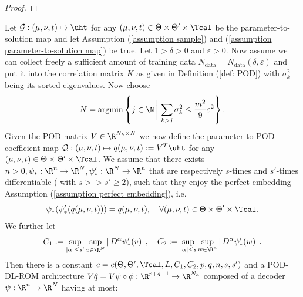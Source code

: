 \begin{proof}

\end{proof}




\begin{theorem} \label{theo: PAC bound for POD-DL-ROM}
    Let $\mathcal{G}: (\mu, \nu, t) \mapsto \uht$ for any $(\mu, \nu, t) \in \Theta \times \Theta' \times \Tcal$ be the
    parameter-to-solution map and let Assumption (\ref{assumption sample}) and (\ref{assumption parameter-to-solution map}) be true. Let $1  > \delta > 0$ and $\varepsilon > 0$.
    Now assume we can collect freely a sufficient amount of training data $N_{\text{data}} = N_{\text{data}}(\delta, \varepsilon)$ and put it into the
    correlation matrix $K$ as given in Definition (\ref{def: POD}) with $\sigma_k^2$ being its sorted eigenvalues. Now choose
    \begin{equation*}
        N = \operatorname{argmin} \left\{ j \in \N \, \bigg\vert \, \sum_{k > j} \sigma^2_k \leq \frac{m^2}{9} \varepsilon^2 \right\}.
    \end{equation*}
    Given the POD matrix $V \in \R^{N_h \times N}$ we now define the parameter-to-POD-coefficient map 
    $\mathcal{Q}: (\mu, \nu, t) \mapsto q(\mu, \nu, t) :=  V^T \uht$ for 
    any $(\mu, \nu, t) \in \Theta \times \Theta' \times \Tcal$. We assume that there exists $n > 0, \psi_* : \R^n \to \R^N, \psi_*' : \R^N \to \R^n$ that are respectively $s$-times and
    $s'$-times differentiable ( with $s >> s' \geq 2$), such that they enjoy the perfect embedding Assumption (\ref{assumption perfect embedding}), i.e. 
    \begin{equation*}
        \psi_*(\psi_*'(q(\mu, \nu, t))) = q(\mu, \nu, t), \quad \forall (\mu, \nu, t) \in \Theta \times \Theta' \times \Tcal.
    \end{equation*}
    We further let 
    \begin{equation*}
        C_1 := \sup\limits_{\vert \alpha \vert \leq s'} \sup\limits_{v \in \R^N} \vert \, D^\alpha \psi_*'(v) \, \vert, \quad 
        C_2 := \sup\limits_{\vert \alpha \vert \leq s} \sup\limits_{w \in \R^n} \vert \, D^\alpha \psi_*'(w) \, \vert.
    \end{equation*}
    Then there is a constant $c = c(\Theta, \Theta', \Tcal, L, C_1, C_2, p, q, n, s, s')$ and a POD-DL-ROM architecture $V \hat{q} =
    V \psi \circ \phi: \R^{p+q+1} \to \R^{N_h}$ composed of a decoder $\psi: \R^n \to \R^N$ having at most:

\end{theorem}
